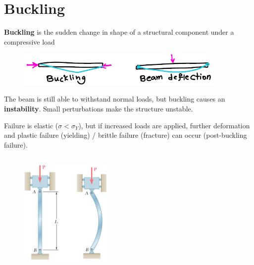 \section{Buckling}

\textbf{Buckling} is the sudden change in shape of a structural component under a compressive load

\begin{figure}[!h]
\centering
\includegraphics[angle=0, width=4in]{Buckling-Figures/BuckleVSDeflect.png}
\vspace{-2mm}
\caption{\small {}}
\vspace{-3mm}
\label{Fig:BuckVSDef}
\end{figure}

\noindent The beam is still able to withstand normal loads, but buckling causes an \textbf{instability}. Small perturbations make the structure unstable. 

\vspace{5pt}

\noindent Failure is elastic ($\sigma < \sigma_Y$), but if increased loads are applied, further deformation and plastic failure (yielding) / brittle failure (fracture) can occur (post-buckling failure).

\subsection{}

\subsubsection{}

\begin{figure}[!h]
\centering
\includegraphics[angle=0, width=1.75in]{Buckling-Figures/Stability of Structures.png}
\vspace{-2mm}
\caption{\small {}}
\vspace{-3mm}
\label{Fig:Stability}
\end{figure}

